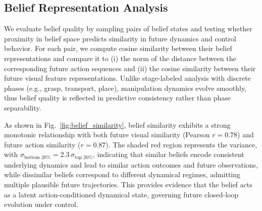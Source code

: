\documentclass[conference]{IEEEtran}
\begin{document}
\subsection{Belief Representation Analysis}
We evaluate belief quality by sampling pairs of belief states and testing whether proximity in belief space predicts similarity in future dynamics and control behavior. For each pair, we compute cosine similarity between their belief representations and compare it to (i) the norm of the distance between the corresponding future action sequences and (ii) the cosine similarity between their future visual feature representations. Unlike stage-labeled analysis with discrete phases (e.g., grasp, transport, place), manipulation dynamics evolve smoothly, thus belief quality is reflected in predictive consistency rather than phase separability.

As shown in Fig.~\ref{fig:belief_similarity}, belief similarity exhibits a strong monotonic relationship with both future visual similarity (Pearson $r=0.78$) and future action similarity ($r=0.87$). The shaded red region represents the variance, with $\sigma_{\text{bottom }20\%} = 2.3\,\sigma_{\text{top }20\%}$, indicating that similar beliefs encode consistent underlying dynamics and lead to similar action outcomes and future observations, while dissimilar beliefs correspond to different dynamical regimes, admitting multiple plausible future trajectories. This provides evidence that the belief acts as a latent action-conditioned dynamical state, governing future closed-loop evolution under control.
\end{document}
